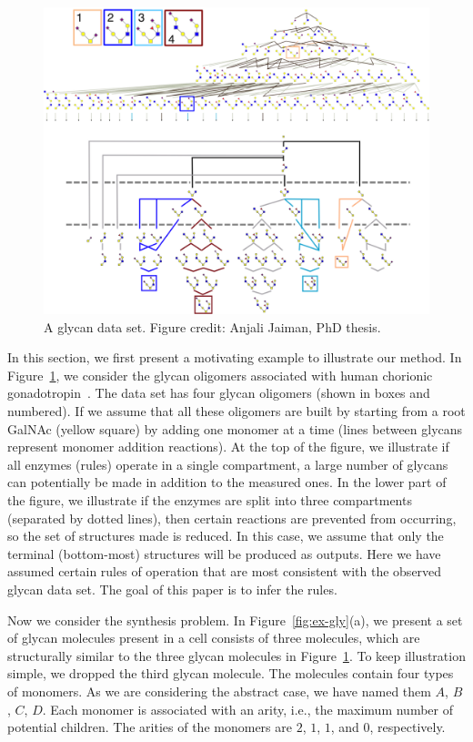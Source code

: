 \begin{figure}[t]
\centering
\includegraphics[width=0.8\linewidth]{gfig2.png}
\caption{A glycan data set. Figure credit: Anjali Jaiman, PhD thesis.}
\label{fig:dataset-gly}
\vspace{-6mm}
\end{figure}



In this section, we first present a motivating example to illustrate our method.
In Figure~\ref{fig:dataset-gly},
we consider the glycan oligomers associated with human chorionic
gonadotropin~\cite{Harrd1992}.
The data set has four glycan oligomers (shown in boxes and numbered). If we assume that all these oligomers
are built by starting from a root GalNAc (yellow square) by adding one monomer at a
time (lines between glycans represent monomer addition reactions). At the top of the figure, we illustrate
if all enzymes (rules) operate in a
single compartment, a large number of glycans can potentially be made in addition to the measured ones.
In the lower part of the figure, we illustrate if the enzymes are split into three compartments
(separated by dotted lines), then certain reactions are prevented from occurring, so the set of structures
made is reduced.
In this case, we assume that only the terminal (bottom-most) structures will be produced as outputs.
Here we have assumed certain rules of operation that are most consistent with the observed glycan data set.
The goal of this paper is to infer the rules.


Now we consider the synthesis problem. In Figure~\ref{fig:ex-gly}(a), we present a set of
glycan molecules present in a cell consists of three molecules, which are structurally similar to the three glycan molecules in Figure~\ref{fig:dataset-gly}.
To keep illustration simple, we dropped the third glycan molecule.
The molecules contain four types of monomers.
As we are considering the abstract case, we have named them $A$, $B$, $C$, $D$.
Each monomer is associated with an arity, i.e., the maximum number of potential children.
The arities of the monomers are $2$, $1$, $1$, and $0$, respectively.

